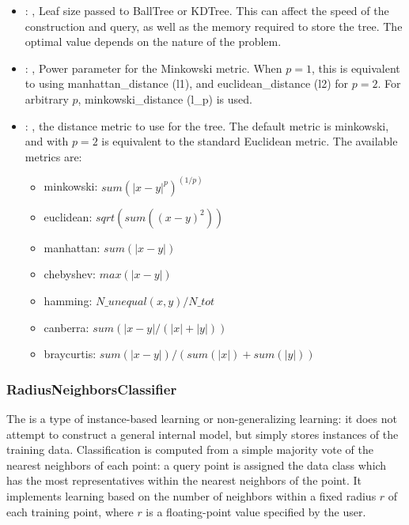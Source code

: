 \begin{itemize}
    \item {}: , 
      Leaf size passed to BallTree or KDTree. This can affect the speed of the construction
      and query, as well as the memory required to store the tree. The optimal value depends on the
      nature of the problem.

    \item {}: , 
      Power parameter for the Minkowski metric. When $p = 1$, this is equivalent to using
      manhattan\_distance (l1), and euclidean\_distance (l2) for $p = 2$. For arbitrary $p$,
      minkowski\_distance                                                  (l\_p) is used.

    \item {}: , 
      the distance metric to use for the tree. The default metric is minkowski, and with
      $p=2$ is equivalent to the standard Euclidean metric.
      The available metrics are:                                                  \begin{itemize}
      \item minkowski: $sum(|x - y|^p)^(1/p)$
      \item euclidean: $sqrt(sum((x - y)^2))$
      \item manhattan: $sum(|x - y|)$                                                    \item
      chebyshev: $max(|x - y|)$                                                    \item hamming:
      $N\_unequal(x, y) / N\_tot$                                                    \item canberra:
      $sum(|x - y| / (|x| + |y|))$                                                    \item
      braycurtis: $sum(|x - y|) / (sum(|x|) + sum(|y|))$
      \end{itemize}
  \end{itemize}


\subsubsection{RadiusNeighborsClassifier}
  The  is a type of instance-based learning or
  non-generalizing learning: it does not attempt to construct a general internal
  model, but simply stores instances of the training data.                          Classification
  is computed from a simple majority vote of the nearest neighbors                          of each
  point: a query point is assigned the data class which has the most
  representatives within the nearest neighbors of the point.                          It implements
  learning based on the number of neighbors within a fixed radius                          $r$ of
  each training point, where $r$ is a floating-point value specified by the
  user.                          

